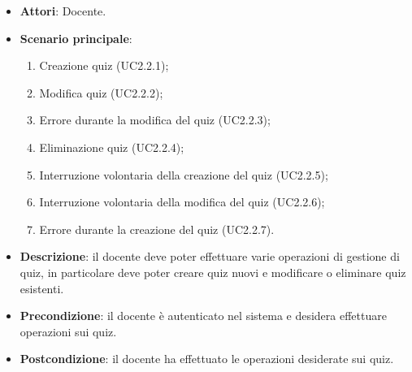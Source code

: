 \begin{itemize}
\item \textbf{Attori}: Docente.
\item \textbf{Scenario principale}:
\begin{enumerate}
\item Creazione quiz (UC2.2.1);
\item Modifica quiz (UC2.2.2);
\item Errore durante la modifica del quiz (UC2.2.3);
\item Eliminazione quiz (UC2.2.4);
\item Interruzione volontaria della creazione del quiz (UC2.2.5);
\item Interruzione volontaria della modifica del quiz (UC2.2.6);
\item Errore durante la creazione del quiz (UC2.2.7).
\end{enumerate}
\item \textbf{Descrizione}: il docente deve poter effettuare varie operazioni di gestione di quiz, in particolare deve poter creare quiz nuovi e modificare o eliminare quiz esistenti.
\item \textbf{Precondizione}: il docente è autenticato nel sistema e desidera effettuare operazioni sui quiz.
\item \textbf{Postcondizione}: il docente ha effettuato le operazioni desiderate sui quiz.
\end{itemize}
